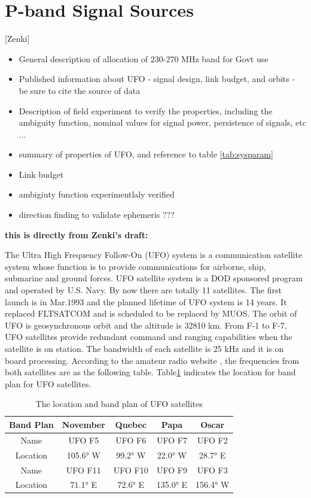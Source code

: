 \documentclass[draftcls,onecolumn]{IEEEtran}  %
\begin{document}
\appendices

\section{P-band Signal Sources}
[Zenki]
\label{app:signal_source}
   \begin{itemize}
     \item General description of allocation of 230-270 MHz band for Govt use
     \item Published information about UFO - signal design, link budget, and orbits - be sure to cite the source of data
     \item Description of field experiment to verify the properties, including the ambiguity function, nominal values for signal power, persistence of signals, etc ... 
     \item summary of properties of UFO, and reference to table \ref{tab:sysparam}
\item Link budget
\item ambigiuty function experimentlaly verified
\item direction finding to validate ephemeris ???
   \end{itemize}
   
   \bf this is directly from Zenki's draft: \rm 
   
   The Ultra High Frequency Follow-On (UFO) system is a communication satellite system whose function is to provide communications for airborne, ship, submarine and ground forces. UFO satellite system is a DOD sponsored program and operated by U.S. Navy. By now there are totally 11 satellites. The first launch is in Mar.1993 and the planned lifetime of UFO system is 14 years. It replaced FLTSATCOM and is scheduled to be replaced by MUOS. The orbit of UFO is geosynchronous orbit and the altitude is 32810 km. From F-1 to F-7, UFO satellites provide redundant command and ranging capabilities when the satellite is on station. The bandwidth of each satellite is 25 kHz and it is on board processing. According to the amateur radio website \cite{Matt:2014}, the frequencies from both satellites are as the following table. Table\ref{Table Band Plan} indicates the location for band plan for UFO satellites.

\begin{table}[ht]
\centering
\begin{tabular}  {|c|c|c|c|c|}
	\hline
     \textbf{Band Plan} & \textbf{November}	& \textbf{Quebec} &	\textbf{Papa} & \textbf{Oscar} \\
    \hline
    Name & UFO F5 & UFO F6 & UFO F7 & UFO F2 \\
    \hline
     Location &	105.6° W & 99.2° W & 	22.0° W	&  28.7° E\\
    \hline
    Name & UFO F11 & UFO F10 & UFO F9  & UFO F3 \\
    \hline
    Location& 71.1° E &	72.6° E &	135.0° E &	156.4° W \\
    \hline
\end{tabular}
\caption{The location and band plan of UFO satellites}
\label{Table Band Plan}
\end{table}
\end{document}
